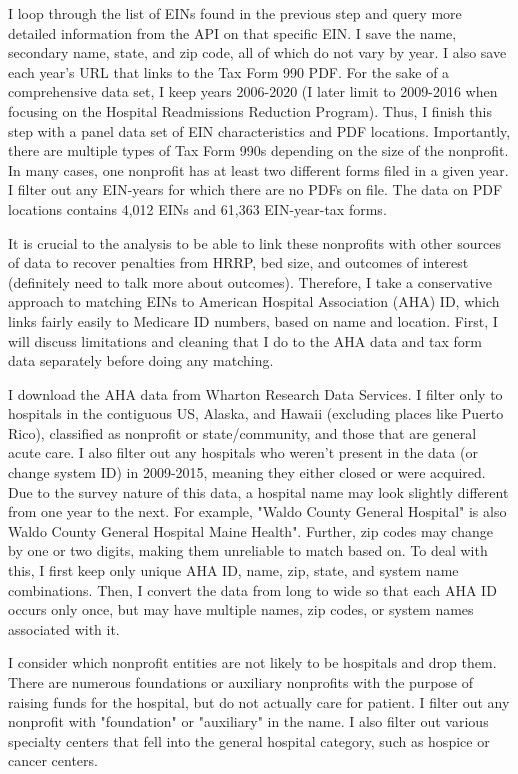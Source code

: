 \documentclass[12pt]{article}
\begin{document}
    I loop through the list of EINs found in the previous step and query more detailed information from the API on that specific EIN. I save the name, secondary name, state, and zip code, all of which do not vary by year. I also save each year's URL that links to the Tax Form 990 PDF. For the sake of a comprehensive data set, I keep years 2006-2020 (I later limit to 2009-2016 when focusing on the Hospital Readmissions Reduction Program). Thus, I finish this step with a panel data set of EIN characteristics and PDF locations. Importantly, there are multiple types of Tax Form 990s depending on the size of the nonprofit. In many cases, one nonprofit has at least two different forms filed in a given year. I filter out any EIN-years for which there are no PDFs on file. The data on PDF locations contains 4,012 EINs and 61,363 EIN-year-tax forms.

    It is crucial to the analysis to be able to link these nonprofits with other sources of data to recover penalties from HRRP, bed size, and outcomes of interest (definitely need to talk more about outcomes). Therefore, I take a conservative approach to matching EINs to American Hospital Association (AHA) ID, which links fairly easily to Medicare ID numbers, based on name and location. First, I will discuss limitations and cleaning that I do to the AHA data and tax form data separately before doing any matching. 

    I download the AHA data from Wharton Research Data Services. I filter only to hospitals in the contiguous US, Alaska, and Hawaii (excluding places like Puerto Rico), classified as nonprofit or state/community, and those that are general acute care. I also filter out any hospitals who weren't present in the data (or change system ID) in 2009-2015, meaning they either closed or were acquired. Due to the survey nature of this data, a hospital name may look slightly different from one year to the next. For example, "Waldo County General Hospital" is also Waldo County General Hospital Maine Health". Further, zip codes may change by one or two digits, making them unreliable to match based on. To deal with this, I first keep only unique AHA ID, name, zip, state, and system name combinations. Then, I convert the data from long to wide so that each AHA ID occurs only once, but may have multiple names, zip codes, or system names associated with it.

    I consider which nonprofit entities are not likely to be hospitals and drop them. There are numerous foundations or auxiliary nonprofits with the purpose of raising funds for the hospital, but do not actually care for patient. I filter out any nonprofit with "foundation" or "auxiliary" in the name. I also filter out various specialty centers that fell into the general hospital category, such as hospice or cancer centers. 
\end{document}
